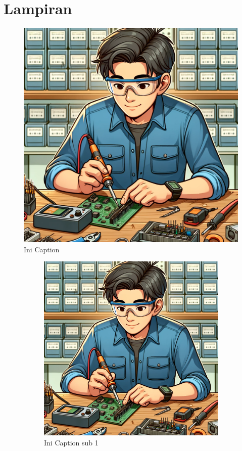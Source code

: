\section*{Lampiran} %
\begin{figure}[H]
    \centering
    \includegraphics[width=0.2\linewidth]{img/contohgambar.png}
    \caption{Ini Caption}
    \label{fig:inirujukan}
\end{figure}
\vspace{0pt}
\begin{figure}[H]
    \centering
    \begin{subfigure}[b]{0.4\linewidth}
        \centering
        \includegraphics[width=\linewidth]{img/contohgambar.png}
        \caption{Ini Caption sub 1\label{fig:inisub1}}
    \end{subfigure}
    \hspace{1cm}
    \begin{subfigure}[b]{0.4\linewidth}

\end{subfigure}
\end{figure}
